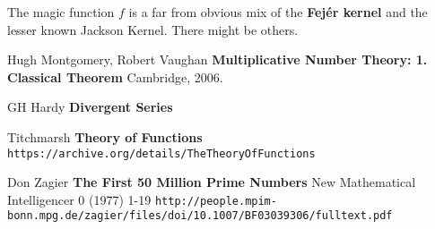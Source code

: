 \documentclass[12pt]{article}
\begin{document}
\selectfont \fontsize{25}{30}\selectfont

\noindent The magic function $f$ is a far from obvious mix of the \textbf{Fej\'{e}r kernel} and the lesser known Jackson Kernel.  There might be others.

\newpage

\selectfont \fontsize{12}{10}\selectfont

\begin{thebibliography}{}

\item Hugh Montgomery, Robert Vaughan \textbf{Multiplicative Number Theory: 1.  Classical Theorem} Cambridge, 2006.

\item GH Hardy \textbf{Divergent Series}

\item Titchmarsh \textbf{Theory of Functions} \texttt{https://archive.org/details/TheTheoryOfFunctions}

\item Don Zagier \textbf{The First 50 Million Prime Numbers} New Mathematical Intelligencer 0 (1977) 1-19  \newline\texttt{http://people.mpim-bonn.mpg.de/zagier/files/doi/10.1007/BF03039306/fulltext.pdf}



\end{thebibliography}
\end{document}
